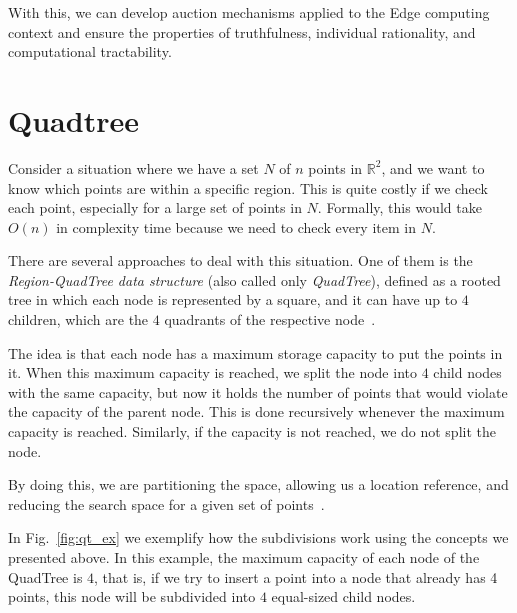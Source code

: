 \documentclass[English]{ic-tese-v3}
\begin{document}
With this, we can develop auction mechanisms applied to the Edge computing context and ensure the properties of truthfulness, individual rationality, and computational tractability.


\section{Quadtree}
\label{sec:quadtree}
Consider a situation where we have a set $N$ of $n$ points in $\mathbb{R}^2$, and we want to know which points are within a specific region. This is quite costly if we check each point, especially for a large set of points in $N$. Formally, this would take $O(n)$ in complexity time because we need to check every item in $N$.

There are several approaches to deal with this situation. One of them is the \emph{Region-QuadTree data structure} (also called only \emph{QuadTree}), defined as a rooted tree in which each node is represented by a square, and it can have up to $4$ children, which are the $4$ quadrants of the respective node~\cite{GeoComp2008, FinkelQT1974, SpatialHanan1990}. 

The idea is that each node has a maximum storage capacity to put the points in it. When this maximum capacity is reached, we split the node into $4$ child nodes with the same capacity, but now it holds the number of points that would violate the capacity of the parent node. This is done recursively whenever the maximum capacity is reached. Similarly, if the capacity is not reached, we do not split the node.

By doing this, we are partitioning the space, allowing us a location reference, and reducing the search space for a given set of points~\cite{GeoComp2008}.

In Fig.~\ref{fig:qt_ex} we exemplify how the subdivisions work using the concepts we presented above. In this example, the maximum capacity of each node of the QuadTree is $4$, that is, if we try to insert a point into a node that already has 4 points, this node will be subdivided into $4$ equal-sized child nodes.
\end{document}
